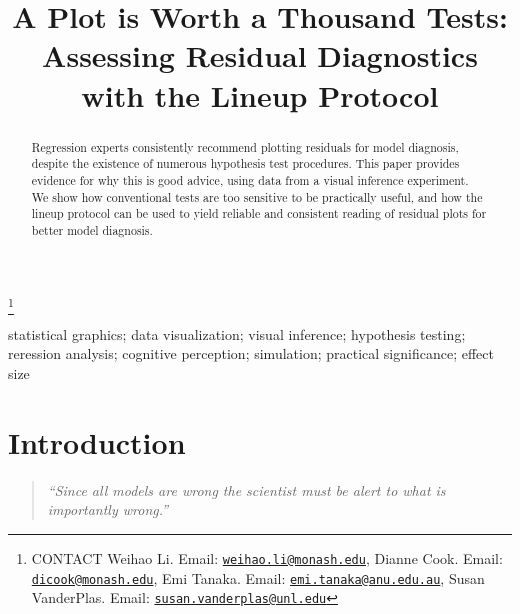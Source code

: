 \documentclass[]{interact}
\theoremstyle{plain}%
\theoremstyle{definition}
\theoremstyle{remark}
\begin{document}

\title{A Plot is Worth a Thousand Tests: Assessing Residual Diagnostics
with the Lineup Protocol}


\author{
}

\thanks{CONTACT Weihao
Li. Email: \href{mailto:weihao.li@monash.edu}{\nolinkurl{weihao.li@monash.edu}}, Dianne
Cook. Email: \href{mailto:dicook@monash.edu}{\nolinkurl{dicook@monash.edu}}, Emi
Tanaka. Email: \href{mailto:emi.tanaka@anu.edu.au}{\nolinkurl{emi.tanaka@anu.edu.au}}, Susan
VanderPlas. Email: \href{mailto:susan.vanderplas@unl.edu}{\nolinkurl{susan.vanderplas@unl.edu}}}

\maketitle

\begin{abstract}
Regression experts consistently recommend plotting residuals for model
diagnosis, despite the existence of numerous hypothesis test procedures.
This paper provides evidence for why this is good advice, using data
from a visual inference experiment. We show how conventional tests are
too sensitive to be practically useful, and how the lineup protocol can
be used to yield reliable and consistent reading of residual plots for
better model diagnosis.
\end{abstract}

\begin{keywords}
statistical graphics; data visualization; visual inference; hypothesis
testing; reression analysis; cognitive perception; simulation; practical
significance; effect size
\end{keywords}

\hypertarget{introduction}{%
\section{Introduction}\label{introduction}}

\begin{quote}
\emph{``Since all models are wrong the scientist must be alert to what
is importantly wrong.''} \citep{box1976science}
\end{quote}
\end{document}
